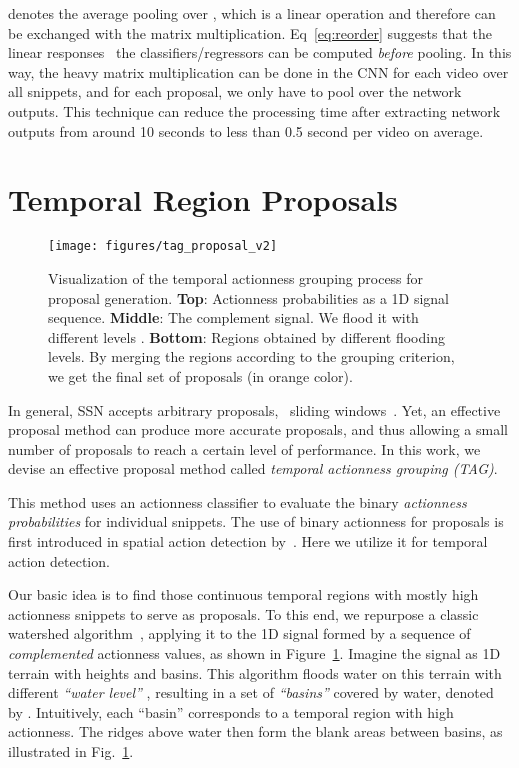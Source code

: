 \documentclass[10pt,twocolumn,letterpaper]{article}
\begin{document}
 denotes the average pooling over ,
which is a linear operation and therefore can be exchanged with
the matrix multiplication.
Eq~\eqref{eq:reorder} suggests that
the linear responses \wrt~the classifiers/regressors can be computed
\emph{before} pooling.
In this way, the heavy matrix multiplication can be done in the CNN for
each video over all snippets, and for each proposal, we only
have to pool over the network outputs.
This technique can reduce the processing time after extracting network outputs from
around 10 seconds to less than 0.5 second per video on average.
 


\section{Temporal Region Proposals}
\label{sec:proposal}

\begin{figure}[t]
	\centering
	\texttt{[image: figures/tag\_proposal\_v2]}
	\caption{\small
		Visualization of the temporal actionness grouping process for proposal generation.
		\textbf{Top}: Actionness probabilities as a 1D signal sequence.
		\textbf{Middle}: The complement signal. We flood it with different levels .
		\textbf{Bottom}: Regions obtained by different flooding levels.
		By merging the regions according to the grouping criterion, we
		get the final set of proposals (in orange color).
	}
	\label{fig:tag_proposal}
	\vspace{-10pt}
\end{figure}

In general, SSN accepts arbitrary proposals,
\eg~sliding windows~\cite{Shou2016SCNN,Yuan2016ScorePyramids}.
Yet, an effective proposal method can produce more accurate proposals,
and thus allowing a small number of proposals to reach a certain level
of performance. In this work, we devise an effective
proposal method called \emph{temporal actionness grouping (TAG)}.

This method uses an actionness classifier
to evaluate the binary \emph{actionness probabilities} for individual snippets.
The use of binary actionness for proposals is first introduced in spatial action detection by~\cite{Wang2016Actionness}.
Here we utilize it for temporal action detection.

Our basic idea is to find those continuous temporal regions with mostly
high actionness snippets to serve as proposals.
To this end, we repurpose a classic watershed algorithm~\cite{Roerdink2000Watershed},
applying it to the 1D signal formed by a sequence of \emph{complemented}
actionness values, as shown in Figure~\ref{fig:tag_proposal}.
Imagine the signal as 1D terrain with heights and basins. This algorithm floods water on this terrain with different \emph{``water level''}
, resulting in a set of \emph{``basins''} covered by water, denoted by .
Intuitively, each ``basin'' corresponds to a temporal region with high actionness.
The ridges above water then form the blank areas between basins, as illustrated in  Fig.~\ref{fig:tag_proposal}.
\end{document}
